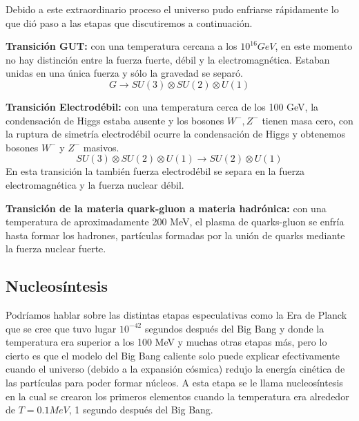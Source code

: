\documentclass{article}
\begin{document}
Debido a este extraordinario proceso el universo pudo enfriarse r\'apidamente lo que di\'o paso a las etapas que discutiremos a continuaci\'on.

\textbf{Transici\'on GUT:} con una temperatura cercana a los $10^{16} GeV$, en este momento no hay distinci\'on entre la fuerza fuerte, d\'ebil y la electromagn\'etica. Estaban unidas en una \'unica fuerza y s\'olo la gravedad se separ\'o.
\begin{equation}
G \rightarrow SU(3) \otimes SU(2) \otimes U(1)
\end{equation}

\textbf{Transici\'on Electrod\'ebil:} con una temperatura cerca de los 100 GeV, la condensaci\'on de Higgs estaba ausente y los bosones $W^{-},Z^{-}$ tienen masa cero, con la ruptura de simetr\'ia electrod\'ebil ocurre la condensaci\'on de Higgs y obtenemos bosones  $W^{-}$  y  $Z^{-}$ masivos. 
\begin{equation}
SU(3) \otimes SU(2) \otimes U(1) \rightarrow SU(2) \otimes U(1)
\end{equation}
En esta transici\'on la tambi\'en fuerza electrod\'ebil se separa en la fuerza electromagn\'etica y la fuerza nuclear d\'ebil.

\textbf{Transici\'on de la materia quark-gluon a materia hadr\'onica:} con una temperatura de aproximadamente 200 MeV, el plasma de quarks-gluon se enfr\'ia hasta formar los hadrones, part\'iculas formadas por la uni\'on de quarks mediante la fuerza nuclear fuerte. 

\subsection*{Nucleos\'intesis}
Podr\'iamos hablar sobre las distintas etapas especulativas como la Era de Planck que se cree que tuvo lugar $10^{-42}$ segundos despu\'es del Big Bang y donde la temperatura era superior a los 100 MeV y muchas otras etapas m\'as, pero lo cierto es que el modelo del Big Bang caliente solo puede explicar efectivamente cuando el universo (debido a la expansi\'on c\'osmica) redujo la energ\'ia cin\'etica de las part\'iculas para poder formar n\'ucleos. A esta etapa se le llama nucleos\'intesis en la cual se crearon los primeros elementos cuando la temperatura era alrededor de $T=0.1 MeV$, 1 segundo despu\'es del Big Bang.
\end{document}
